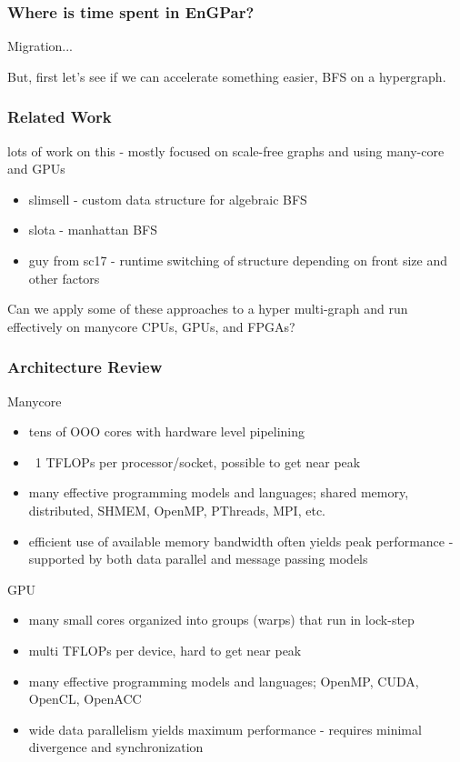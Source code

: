 \documentclass{beamer}
\begin{document}
\begin{frame}
  \frametitle{Where is time spent in EnGPar?}
  Migration...

  But, first let's see if we can accelerate something easier, BFS on a
  hypergraph.
\end{frame}

\begin{frame}
  \frametitle{Related Work}
  lots of work on this - mostly focused on scale-free graphs and using many-core
  and GPUs
  \begin{itemize}
    \item slimsell - custom data structure for algebraic BFS
    \item slota - manhattan BFS
    \item guy from sc17 - runtime switching of structure depending on front size
      and other factors
  \end{itemize}
  Can we apply some of these approaches to a hyper multi-graph and run
  effectively on manycore CPUs, GPUs, and FPGAs?
\end{frame}

\begin{frame}
  \frametitle{Architecture Review}
  Manycore
  \begin{itemize}
    \item tens of OOO cores with hardware level pipelining
    \item ~1 TFLOPs per processor/socket, possible to get near peak
    \item many effective programming models and languages; shared memory,
      distributed, SHMEM, OpenMP, PThreads, MPI, etc.
    \item efficient use of available memory bandwidth often yields peak performance - 
      supported by both data parallel and message passing models
  \end{itemize}
  GPU
  \begin{itemize}
    \item many small cores organized into groups (warps) that run in lock-step
    \item multi TFLOPs per device, hard to get near peak
    \item many effective programming models and languages; OpenMP, CUDA, OpenCL,
      OpenACC
    \item wide data parallelism yields maximum performance - requires minimal divergence
      and synchronization
  \end{itemize}
\end{frame}
\end{document}
